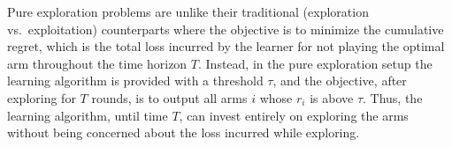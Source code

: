 %
%

Pure exploration problems are unlike their traditional (exploration vs.\ exploitation) counterparts where the  objective is to minimize the cumulative regret, which is the total loss incurred by the learner for not playing the optimal arm throughout the time horizon $T$. Instead, in the pure exploration setup the learning algorithm is provided with a threshold $\tau$, and the objective, after exploring for $T$ rounds, is to  output all arms $i$ whose $r_{i}$ is above $\tau$. Thus, the learning algorithm, until  time $T$, can invest entirely on exploring the arms  without being concerned about the loss incurred while exploring.  



